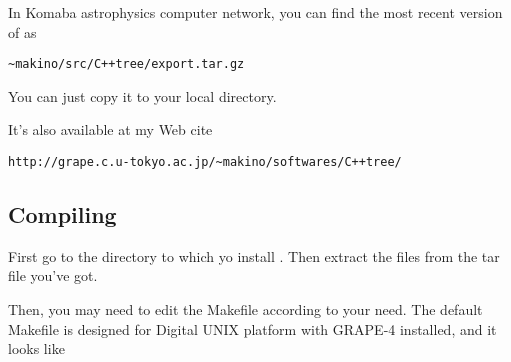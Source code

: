 In Komaba astrophysics computer network, you can find the most recent
version of \nbody as
\begin{verbatim}
~makino/src/C++tree/export.tar.gz
\end{verbatim}
You can just copy it to your local directory.

It's also available at my Web cite
\begin{verbatim}
http://grape.c.u-tokyo.ac.jp/~makino/softwares/C++tree/
\end{verbatim}


\subsection{Compiling \nbody}

First go to the directory to which yo install \nbody. Then extract the 
files from the tar file you've got.

Then, you may need to edit the Makefile according to your need. The
default Makefile is designed for Digital UNIX platform with GRAPE-4
installed, and it looks like

